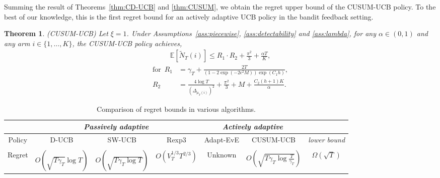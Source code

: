 \documentclass[letterpaper]{article} %
\newtheorem{theorem}{Theorem}
\begin{document}
Summing the result of Theorems~\ref{thm:CD-UCB} and \ref{thm:CUSUM}, we obtain the regret upper bound of the CUSUM-UCB policy. To the best of our knowledge, this is the first regret bound for an actively adaptive UCB policy in the bandit feedback setting.
\begin{theorem}\label{thm:CUSUM-UCB}
\emph{(CUSUM-UCB)} Let $\xi=1$.  Under
Assumptions~\ref{ass:piecewise}, \ref{ass:detectability} and
\ref{ass:lambda}, for any $\alpha\in(0,1)$ and any arm
$i\in\{1,\ldots,K\}$, the CUSUM-UCB policy achieves,
\begin{align}
\mathbb{E}[\tilde{N}_T(i)]\leq R_1\cdot
  R_2+\frac{\pi^2}{3}+\frac{\alpha T}{K},
\end{align}
\begin{align*}
\text{for} \,\,\, R_1&=\gamma_T+\frac{2 T}{(1-2\exp(-2\epsilon^2M))\exp(C_1h)},\\
R_2&=\frac{4\log T}{(\Delta_{\mu_T(i)})^2}+\frac{\pi^2}{3}+M+\frac{C_2(h+1)K}{\alpha}.
\end{align*}
\end{theorem}


\begin{table}[t]
  \small
  \centering
  \caption{
  Comparison of regret bounds in various algorithms.
  }
  \label{table:regret}
  \tabcolsep 1pt
\begin{center}
    \begin{tabular}{|c|c|c|c|c|c|c|}
    \hline
    & \multicolumn{3}{c|}{\em Passively adaptive} &
                                                   \multicolumn{2}{c|}{\em
                                                   Actively adaptive}
      & \\
    \hline
    \multirow{2}{*}{Policy} & D-UCB & SW-UCB & Rexp3
    & Adapt-EvE  & CUSUM-UCB & {\em lower bound}\\
    &  {\scriptsize\cite{kocsis2006discounted}}& {\scriptsize\cite{garivier2008upper}}& {\scriptsize\cite{besbes2014stochastic}} & {\scriptsize\cite{hartland2007change}}  & & {\scriptsize \cite{garivier2008upper}}\\
    \hline
    Regret & $O(\sqrt{T\gamma_T}\log T)$ & $O(\sqrt{T\gamma_T\log T})$ & $O(V_T^{1/3}T^{2/3})$
    & Unknown & $O(\sqrt{T\gamma_T\log{\frac{T}{\gamma_T}}})$ & $\Omega(\sqrt{T})$\\
    \hline
  \end{tabular}
\end{center}
  \label{tbl:regret_comparison}
\end{table}
\end{document}
